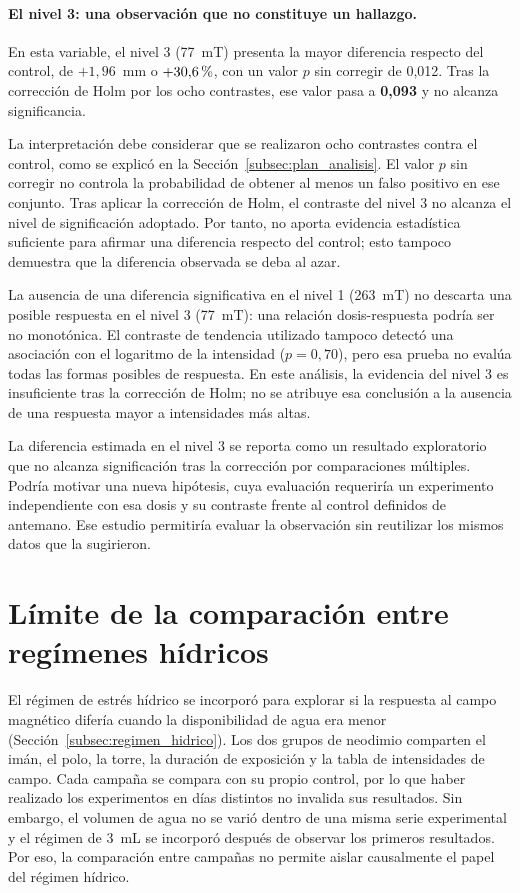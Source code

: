 \paragraph{El nivel 3: una observación que no constituye un hallazgo.}

En esta variable, el nivel 3 (77~mT) presenta la mayor diferencia respecto del control, de \(+1{,}96\)~mm o \(+30{,}6\,\text{\%}\), con un valor \(p\) sin corregir de 0,012. Tras la corrección de Holm por los ocho contrastes, ese valor pasa a \textbf{0,093} y no alcanza significancia.

La interpretación debe considerar que se realizaron ocho contrastes contra el control, como se explicó en la Sección~\ref{subsec:plan_analisis}. El valor \(p\) sin corregir no controla la probabilidad de obtener al menos un falso positivo en ese conjunto. Tras aplicar la corrección de Holm, el contraste del nivel 3 no alcanza el nivel de significación adoptado. Por tanto, no aporta evidencia estadística suficiente para afirmar una diferencia respecto del control; esto tampoco demuestra que la diferencia observada se deba al azar.

La ausencia de una diferencia significativa en el nivel 1 (263~mT) no descarta una posible respuesta en el nivel 3 (77~mT): una relación dosis-respuesta podría ser no monotónica. El contraste de tendencia utilizado tampoco detectó una asociación con el logaritmo de la intensidad (\(p = 0{,}70\)), pero esa prueba no evalúa todas las formas posibles de respuesta. En este análisis, la evidencia del nivel 3 es insuficiente tras la corrección de Holm; no se atribuye esa conclusión a la ausencia de una respuesta mayor a intensidades más altas.

La diferencia estimada en el nivel 3 se reporta como un resultado exploratorio que no alcanza significación tras la corrección por comparaciones múltiples. Podría motivar una nueva hipótesis, cuya evaluación requeriría un experimento independiente con esa dosis y su contraste frente al control definidos de antemano. Ese estudio permitiría evaluar la observación sin reutilizar los mismos datos que la sugirieron.

\section{Límite de la comparación entre regímenes hídricos}
\label{sec:res_interaccion}

El régimen de estrés hídrico se incorporó para explorar si la respuesta al campo magnético difería cuando la disponibilidad de agua era menor (Sección~\ref{subsec:regimen_hidrico}). Los dos grupos de neodimio comparten el imán, el polo, la torre, la duración de exposición y la tabla de intensidades de campo. Cada campaña se compara con su propio control, por lo que haber realizado los experimentos en días distintos no invalida sus resultados. Sin embargo, el volumen de agua no se varió dentro de una misma serie experimental y el régimen de 3~mL se incorporó después de observar los primeros resultados. Por eso, la comparación entre campañas no permite aislar causalmente el papel del régimen hídrico.

